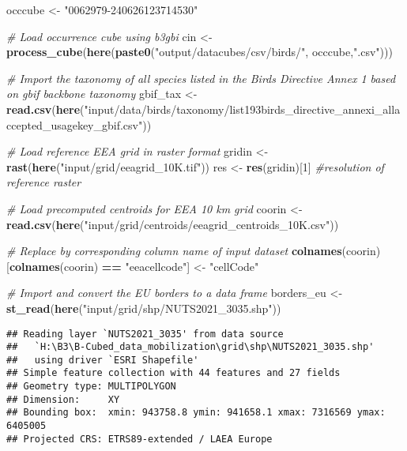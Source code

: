 \documentclass[
]{article}
\newenvironment{Shaded}{\begin{snugshade}}{\end{snugshade}}
\newcommand{\CommentTok}[1]{\textcolor[rgb]{0.56,0.35,0.01}{\textit{#1}}}
\newcommand{\DecValTok}[1]{\textcolor[rgb]{0.00,0.00,0.81}{#1}}
\newcommand{\FunctionTok}[1]{\textcolor[rgb]{0.13,0.29,0.53}{\textbf{#1}}}
\newcommand{\NormalTok}[1]{#1}
\newcommand{\OtherTok}[1]{\textcolor[rgb]{0.56,0.35,0.01}{#1}}
\newcommand{\SpecialCharTok}[1]{\textcolor[rgb]{0.81,0.36,0.00}{\textbf{#1}}}
\newcommand{\StringTok}[1]{\textcolor[rgb]{0.31,0.60,0.02}{#1}}
\begin{document}
\begin{Shaded}
\begin{Highlighting}[]
\NormalTok{occcube }\OtherTok{\textless{}{-}} \StringTok{"0062979{-}240626123714530"}

\CommentTok{\# Load occurrence cube using b3gbi}
\NormalTok{cin }\OtherTok{\textless{}{-}} \FunctionTok{process\_cube}\NormalTok{(}\FunctionTok{here}\NormalTok{(}\FunctionTok{paste0}\NormalTok{(}\StringTok{"output/datacubes/csv/birds/"}\NormalTok{, occcube,}\StringTok{".csv"}\NormalTok{)))}

\CommentTok{\# Import the taxonomy of all species listed in the Birds Directive Annex 1 based on gbif backbone taxonomy}
\NormalTok{gbif\_tax }\OtherTok{\textless{}{-}} \FunctionTok{read.csv}\NormalTok{(}\FunctionTok{here}\NormalTok{(}\StringTok{"input/data/birds/taxonomy/list193birds\_directive\_annexi\_allaccepted\_usagekey\_gbif.csv"}\NormalTok{))}

\CommentTok{\# Load reference EEA grid in raster format}
\NormalTok{gridin }\OtherTok{\textless{}{-}} \FunctionTok{rast}\NormalTok{(}\FunctionTok{here}\NormalTok{(}\StringTok{"input/grid/eeagrid\_10K.tif"}\NormalTok{))}
\NormalTok{res }\OtherTok{\textless{}{-}} \FunctionTok{res}\NormalTok{(gridin)[}\DecValTok{1}\NormalTok{] }\CommentTok{\#resolution of reference raster}

\CommentTok{\# Load precomputed centroids for EEA 10 km grid}
\NormalTok{coorin }\OtherTok{\textless{}{-}} \FunctionTok{read.csv}\NormalTok{(}\FunctionTok{here}\NormalTok{(}\StringTok{"input/grid/centroids/eeagrid\_centroids\_10K.csv"}\NormalTok{))}

\CommentTok{\# Replace by corresponding column name of input dataset}
\FunctionTok{colnames}\NormalTok{(coorin)[}\FunctionTok{colnames}\NormalTok{(coorin) }\SpecialCharTok{==} \StringTok{"eeacellcode"}\NormalTok{] }\OtherTok{\textless{}{-}} \StringTok{"cellCode"}

\CommentTok{\# Import and convert the EU borders to a data frame}
\NormalTok{borders\_eu }\OtherTok{\textless{}{-}} \FunctionTok{st\_read}\NormalTok{(}\FunctionTok{here}\NormalTok{(}\StringTok{"input/grid/shp/NUTS2021\_3035.shp"}\NormalTok{))}
\end{Highlighting}
\end{Shaded}

\begin{verbatim}
## Reading layer `NUTS2021_3035' from data source 
##   `H:\B3\B-Cubed_data_mobilization\grid\shp\NUTS2021_3035.shp' 
##   using driver `ESRI Shapefile'
## Simple feature collection with 44 features and 27 fields
## Geometry type: MULTIPOLYGON
## Dimension:     XY
## Bounding box:  xmin: 943758.8 ymin: 941658.1 xmax: 7316569 ymax: 6405005
## Projected CRS: ETRS89-extended / LAEA Europe
\end{verbatim}
\end{document}
